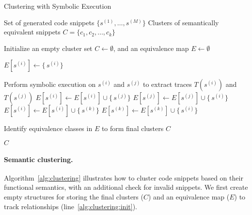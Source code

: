 \begin{algorithm}[ht!]
    \caption{Clustering with Symbolic Execution}
    \label{alg:clustering}
    \begin{algorithmic}[1]
    \Require Set of generated code snippets $\{s^{(1)}, \ldots, s^{(M)}\}$
    \Ensure Clusters of semantically equivalent snippets $C = \{c_1, c_2, \ldots, c_k\}$
    
    \State Initialize an empty cluster set $C \gets \emptyset$, and an equivalence map $E \gets \emptyset$ \label{alg:clustering:init}
    
            \State $E[s^{(i)}] \gets \{\,s^{(i)}\}$ 
        \EndIf
    \EndFor
    
     \label{alg:clustering:pairwise}
        \State Perform symbolic execution on $s^{(i)}$ and $s^{(j)}$ to extract traces $T(s^{(i)})$ and $T(s^{(j)})$ \label{alg:clustering:trace}
         \label{alg:clustering:check}
            \State $E[s^{(i)}] \gets E[s^{(i)}] \cup \{\,s^{(j)}\}$
            \State $E[s^{(j)}] \gets E[s^{(j)}] \cup \{\,s^{(i)}\}$ \label{alg:clustering:update}
        \EndIf
        \State {}
            \State $E[s^{(i)}] \gets E[s^{(i)}] \cup \{\,s^{(k)}\}$
            \State $E[s^{(k)}] \gets E[s^{(k)}] \cup \{\,s^{(i)}\}$
        \EndIf
    \EndFor
    
    \State Identify equivalence classes in $E$ to form final clusters $C$ \label{alg:clustering:extract}
    
    \State \Return $C$ \label{alg:clustering:return}
    \end{algorithmic}
    \end{algorithm}


\paragraph{Semantic clustering.}
Algorithm~\ref{alg:clustering} illustrates how to cluster code snippets based on their functional semantics, with an additional check for invalid snippets. 
We first create empty structures for storing the final clusters ($C$) and an equivalence map ($E$) to track relationships (line~\ref{alg:clustering:init}). 

